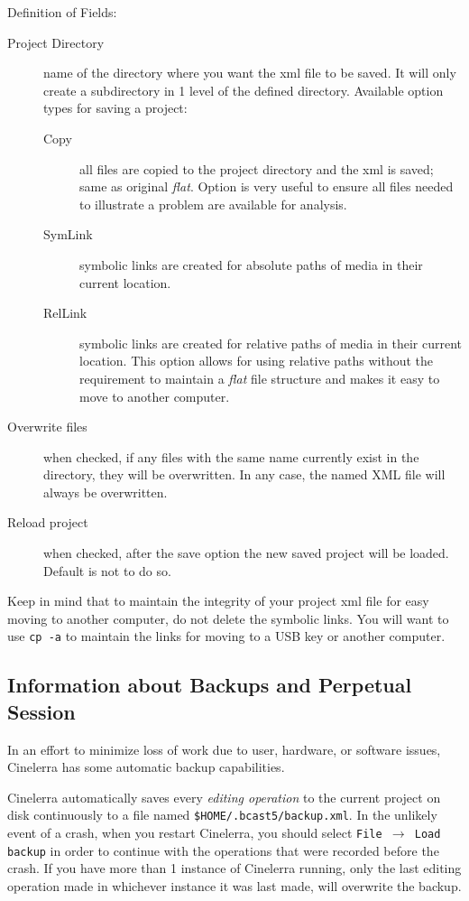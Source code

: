 \noindent Definition of Fields:

\begin{description}
    \item[Project Directory] name of the directory where you want the xml file to be saved.  It will only create
    a subdirectory in 1 level of the defined directory.
    Available option types for saving a project:
    \begin{description}
        \item[Copy] all files are copied to the project directory and the xml is saved; same as original \textit{flat}.
        Option is very useful to ensure all files needed to illustrate a problem are available for analysis.
        \item[SymLink] symbolic links are created for absolute paths of media in their current location.
        \item[RelLink] symbolic links are created for relative paths of media in their current location.  This
        option allows for using relative paths without the requirement to maintain a \textit{flat} file structure
        and makes it easy to move to another computer.
    \end{description}
    \item[Overwrite files] when checked, if any files with the same name currently exist in the directory, they
    will be overwritten.  In any case, the named XML file will always be overwritten.
    \item[Reload project] when checked, after the save option the new saved project will be loaded. Default is not to do so.
\end{description}

\noindent Keep in mind that to maintain the integrity of your project xml file for easy moving to another computer, do not delete the symbolic links.  You will want to use \texttt{cp\,-a} to maintain the links for moving to a USB key or another computer.

\subsection{Information about Backups and Perpetual Session}%
\label{sub:information_backups_perpetual_session}

In an effort to minimize loss of work due to user, hardware, or software issues, Cinelerra has some automatic backup capabilities.

Cinelerra automatically saves every \textit{editing operation} to the current project on disk continuously to a file named \texttt{\$HOME/.bcast5/backup.xml}.  In the unlikely event of a crash, when you restart Cinelerra, you should select \texttt{File $\rightarrow$ Load backup} in order to continue with the operations that were recorded before the crash.  If you have more than 1 instance of Cinelerra running, only the last editing operation made in whichever instance it was last made, will overwrite the backup. 

